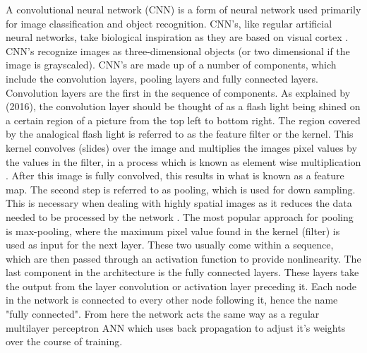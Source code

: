 A convolutional neural network (CNN) is a form of neural network used primarily for image classification and object recognition. CNN's, like regular artificial neural networks, take biological inspiration as they are based on visual cortex \citep{adit}. CNN's recognize images as three-dimensional objects (or two dimensional if the image is grayscaled). CNN's are made up of a number of components, which include the convolution layers, pooling layers and fully connected layers. Convolution layers are the first in the sequence of components. As explained by \citeauthor{adit} (2016), the convolution layer should be thought of as a flash light being shined on a certain region of a picture from the top left to bottom right. The region covered by the analogical flash light is referred to as the feature filter or the kernel. This kernel convolves (slides) over the image and multiplies the images pixel values by the values in the filter, in a process which is known as element wise multiplication \citep{adit}. After this image is fully convolved, this results in what is known as a feature map. The second step is referred to as pooling, which is used for down sampling. This is necessary when dealing with highly spatial images as it reduces the data needed to be processed by the network \citep{kar}. The most popular approach for pooling is max-pooling, where the maximum pixel value found in the kernel (filter) is used as input for the next layer. These two usually come within a sequence, which are then passed through an activation function to provide nonlinearity. The last component in the architecture is the fully connected layers. These layers take the output from the layer convolution or activation layer preceding it. Each node in the network is connected to every other node following it, hence the name "fully connected". From here the network acts the same way as a regular multilayer perceptron ANN which uses back propagation to adjust it's weights over the course of training. 

